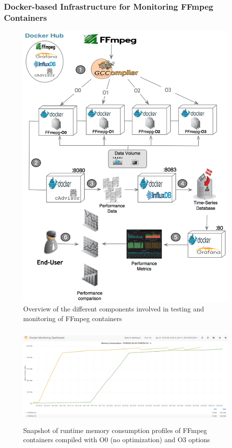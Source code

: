 \subsubsection{Docker-based Infrastructure for Monitoring FFmpeg Containers}
\begin{figure}[!b]
	\centering
	\includegraphics[width=1.\linewidth]{Ressources/infra_ffmpeg.png}
	\caption{Overview of the different components involved in testing and monitoring of FFmpeg containers}
\end{figure}
\begin{figure}
	
	\center
	
	\includegraphics[width=14cm,height=5.1cm]{Ressources/infra_stats.png}
	\caption{Snapshot of runtime memory consumption profiles of FFmpeg containers compiled with O0 (no optimization) and O3 options}
	
	\label{AAA}
	
\end{figure}
